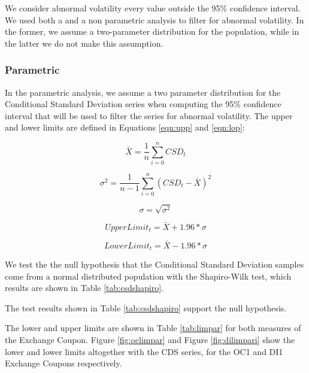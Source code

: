 \documentclass[cic,tc, english]{iiufrgs}
\begin{document}
    

    

    We consider abnormal volatility every value outside the 95\% confidence interval. We used both a  and a non parametric analysis to filter for abnormal volatility. In the former, we assume a two-parameter distribution for the population, while in the latter we do not make this assumption.

\subsubsection{Parametric}

    In the parametric analysis, we assume a two parameter distribution for the Conditional Standard Deviation series when computing the 95\% confidence interval that will be used to filter the series for abnormal volatility. The upper and lower limits are defined in Equations \ref{eqn:upp} and \ref{eqn:lop}: 

    $$\bar{X} = \frac{1}{n} \displaystyle\sum_{i=0}^{n} CSD_t$$

    $$\sigma^2 = \frac{1}{n-1} \displaystyle\sum_{i=0}^{n} (CSD_t - \bar{X})^2$$

    $$\sigma = \sqrt{\sigma^2}$$

    \begin{equation}
        \label{eqn:upp}
        UpperLimit_t = \bar{X} + 1.96 * \sigma
    \end{equation}

    \begin{equation}
        \label{eqn:lop}
        LowerLimit_t = \bar{X} - 1.96 * \sigma
    \end{equation}

    We test the the null hypothesis that the Conditional Standard Deviation samples come from a normal distributed population with the Shapiro-Wilk test, which results are shown in Table \ref{tab:csdshapiro}.

    

    The test results shown in Table \ref{tab:csdshapiro} support the null hypothesis.

    The lower and upper limits are shown in Table \ref{tab:limpar} for both measures of the Exchange Coupon. Figure \ref{fig:oclimpar} and Figure \ref{fig:dilimpari} show the lower and lower limits altogether with the CDS series, for the OC1 and DI1 Exchange Coupons respectively.
\end{document}
